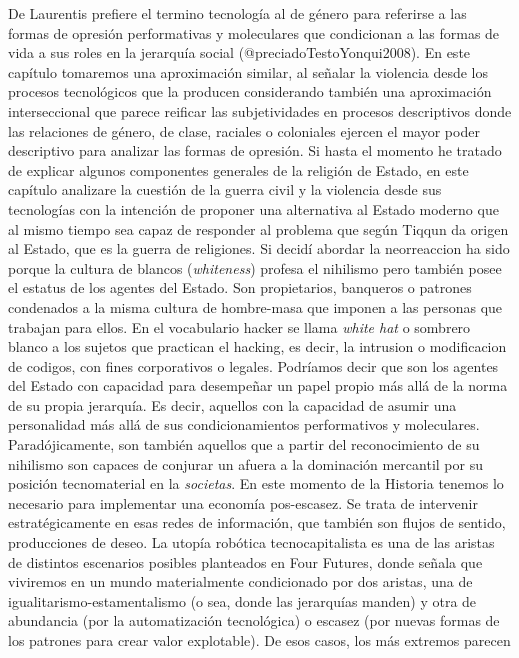\documentclass[
]{article}
\begin{document}
De Laurentis prefiere el termino tecnología al de género para referirse
a las formas de opresión performativas y moleculares que condicionan a
las formas de vida a sus roles en la jerarquía social
(@preciadoTestoYonqui2008). En este capítulo tomaremos una aproximación
similar, al señalar la violencia desde los procesos tecnológicos que la
producen considerando también una aproximación interseccional que parece
reificar las subjetividades en procesos descriptivos donde las
relaciones de género, de clase, raciales o coloniales ejercen el mayor
poder descriptivo para analizar las formas de opresión. Si hasta el
momento he tratado de explicar algunos componentes generales de la
religión de Estado, en este capítulo analizare la cuestión de la guerra
civil y la violencia desde sus tecnologías con la intención de proponer
una alternativa al Estado moderno que al mismo tiempo sea capaz de
responder al problema que según Tiqqun da origen al Estado, que es la
guerra de religiones. Si decidí abordar la neorreaccion ha sido porque
la cultura de blancos (\emph{whiteness}) profesa el nihilismo pero
también posee el estatus de los agentes del Estado. Son propietarios,
banqueros o patrones condenados a la misma cultura de hombre-masa que
imponen a las personas que trabajan para ellos. En el vocabulario hacker
se llama \emph{white hat} o sombrero blanco a los sujetos que practican
el hacking, es decir, la intrusion o modificacion de codigos, con fines
corporativos o legales. Podríamos decir que son los agentes del Estado
con capacidad para desempeñar un papel propio más allá de la norma de su
propia jerarquía. Es decir, aquellos con la capacidad de asumir una
personalidad más allá de sus condicionamientos performativos y
moleculares. Paradójicamente, son también aquellos que a partir del
reconocimiento de su nihilismo son capaces de conjurar un afuera a la
dominación mercantil por su posición tecnomaterial en la
\emph{societas}. En este momento de la Historia tenemos lo necesario
para implementar una economía pos-escasez. Se trata de intervenir
estratégicamente en esas redes de información, que también son flujos de
sentido, producciones de deseo. La utopía robótica tecnocapitalista es
una de las aristas de distintos escenarios posibles planteados en Four
Futures, donde señala que viviremos en un mundo materialmente
condicionado por dos aristas, una de igualitarismo-estamentalismo (o
sea, donde las jerarquías manden) y otra de abundancia (por la
automatización tecnológica) o escasez (por nuevas formas de los patrones
para crear valor explotable). De esos casos, los más extremos parecen
\end{document}
